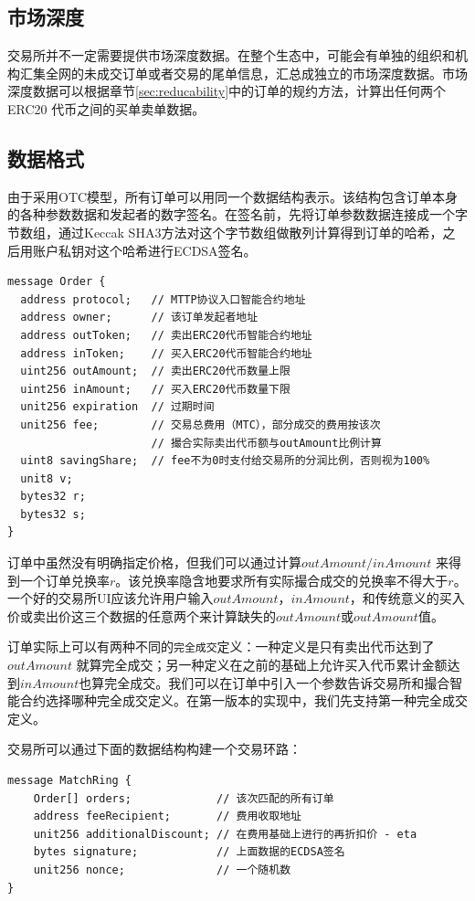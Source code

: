 \documentclass[UTF8,nofonts]{ctexart}
\begin{document}
\subsection{市场深度\label{sec:marketdepth}}

交易所并不一定需要提供市场深度数据。在整个生态中，可能会有单独的组织和机构汇集全网的未成交订单或者交易的尾单信息，汇总成独立的市场深度数据。市场深度数据可以根据章节\ref{sec:reducability}中的订单的规约方法，计算出任何两个ERC20 代币之间的买单卖单数据。

\subsection{数据格式\label{sec:dataformat}}

由于采用OTC模型，所有订单可以用同一个数据结构表示。该结构包含订单本身的各种参数数据和发起者的数字签名。在签名前，先将订单参数数据连接成一个字节数组，通过Keccak SHA3方法对这个字节数组做散列计算得到订单的哈希，之后用账户私钥对这个哈希进行ECDSA签名。


\begin{verbatim}
message Order {
  address protocol;   // MTTP协议入口智能合约地址
  address owner;      // 该订单发起者地址
  address outToken;   // 卖出ERC20代币智能合约地址
  address inToken;    // 买入ERC20代币智能合约地址
  uint256 outAmount;  // 卖出ERC20代币数量上限
  uint256 inAmount;   // 买入ERC20代币数量下限
  unit256 expiration  // 过期时间
  unit256 fee;        // 交易总费用（MTC），部分成交的费用按该次
                      // 撮合实际卖出代币额与outAmount比例计算
  uint8 savingShare;  // fee不为0时支付给交易所的分润比例，否则视为100%
  unit8 v;
  bytes32 r;
  bytes32 s;
}
\end{verbatim}

订单中虽然没有明确指定价格，但我们可以通过计算$outAmount / inAmount$ 来得到一个订单兑换率$r$。该兑换率隐含地要求所有实际撮合成交的兑换率不得大于$r$。 一个好的交易所UI应该允许用户输入$outAmount$，$inAmount$，和传统意义的买入价或卖出价这三个数据的任意两个来计算缺失的$outAmount$或$outAmount$值。

订单实际上可以有两种不同的\texttt{完全成交}定义：一种定义是只有卖出代币达到了$outAmount$ 就算完全成交；另一种定义在之前的基础上允许买入代币累计金额达到$inAmount$也算完全成交。我们可以在订单中引入一个参数告诉交易所和撮合智能合约选择哪种完全成交定义。在第一版本的实现中，我们先支持第一种完全成交定义。


交易所可以通过下面的数据结构构建一个交易环路：
\begin{verbatim}
message MatchRing {
    Order[] orders;             // 该次匹配的所有订单
    address feeRecipient;       // 费用收取地址
    unit256 additionalDiscount; // 在费用基础上进行的再折扣价 - eta
    bytes signature;            // 上面数据的ECDSA签名
    unit256 nonce;              // 一个随机数
}
\end{verbatim}
\end{document}
